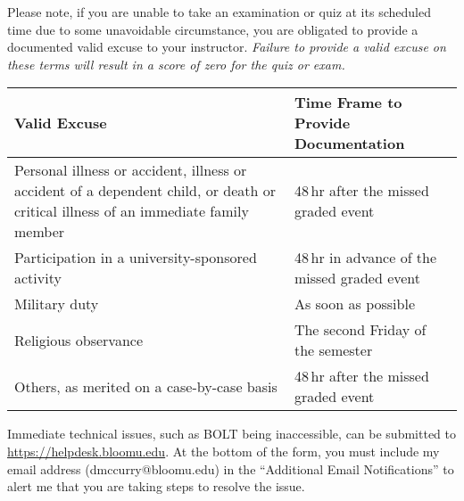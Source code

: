 \documentclass[11pt,letterpaper]{article}
\begin{document}
Please note, if you are unable to take an examination or quiz at
its scheduled time due to some unavoidable circumstance, you are obligated to
provide a documented valid excuse to your instructor. \emph{Failure to provide a
valid excuse on these terms will result in a score of zero for the quiz or
exam.}

	\begin{center}
		\renewcommand\arraystretch{1.25}
\begin{tabularx}{\linewidth} {X X}
	\toprule
	\bfseries Valid Excuse & \bfseries Time Frame to Provide Documentation
	\\ \midrule
	Personal illness or accident, illness or accident of a dependent child,
	or death or critical illness of an immediate family member &
	48\,hr after the missed graded event \\
	Participation in a university-sponsored activity &
	48\,hr in advance of the missed graded event \\
	Military duty & As soon as possible \\
	Religious observance & The second Friday of the semester \\
	Others, as merited on a case-by-case basis & 48\,hr after the
	missed graded event \\
	\bottomrule
\end{tabularx}
\end{center}

Immediate technical issues, such as BOLT being inaccessible, can be submitted to
\url{https://helpdesk.bloomu.edu}. At the bottom of the form, you must include
my email address (dmccurry@bloomu.edu) in the ``Additional Email Notifications''
to alert me that you are taking steps to resolve the issue.
\end{document}
